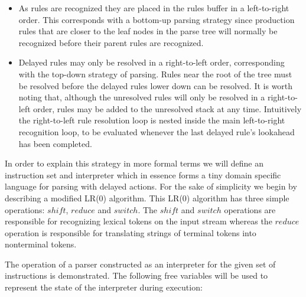 \documentclass[a4paper,11pt]{article}
\begin{document}
\begin{itemize}
\item As rules are recognized they are placed in the rules buffer in a left-to-right order. 
This corresponds with a bottom-up parsing strategy since production rules that are closer to the leaf nodes in the parse tree will normally be recognized before their parent rules are recognized.
\item Delayed rules may only be resolved in a right-to-left order, corresponding with the top-down strategy of parsing. Rules near the root of the tree must be resolved before 
the delayed rules lower down can be resolved. 
It is worth noting that, although the unresolved rules will only be resolved in a right-to-left order, rules may be added to the unresolved stack at any time.
Intuitively the right-to-left rule resolution loop is nested inside the main left-to-right recognition loop, to be evaluated whenever the last delayed rule's lookahead has been completed.
\end{itemize}

In order to explain this strategy in more formal terms we will define an instruction set and interpreter which in essence forms a tiny domain specific language for parsing with delayed actions.
For the sake of simplicity we begin by describing a modified LR(0) algorithm. This LR(0) algorithm has three simple operations: $shi\!ft$, $reduce$ and $switch$. 
The $shi\!ft$ and $switch$ operations are responsible for recognizing lexical tokens on the input stream whereas the $reduce$ operation is responsible for translating strings of terminal tokens into nonterminal tokens.

The operation of a parser constructed as an interpreter for the given set of instructions is demonstrated.
The following free variables will be used to represent the state of the interpreter during execution:
\end{document}
